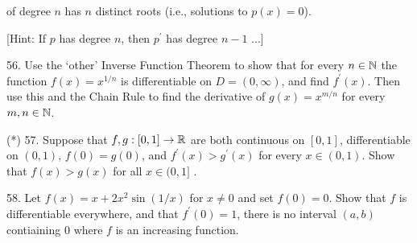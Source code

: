 \documentclass[12pt]{article}
\begin{document}
\begin{description}
\ssk

\item{\spc} of degree $n$ has  
 $n$ distinct roots (i.e., solutions to $p(x)=0$).

\ssk

\item{\spc} [Hint: If $p$ has degree $n$, then $p^\prime$ has degree $n-1$ ...]
 
\msk

\item{56.} Use the `other' Inverse Function Theorem to show that for every $n\in{\mathbb N}$ 
the function $f(x)=x^{1/n}$ is differentiable on $D=(0,\infty)$, and find $f^\prime(x)$.
Then use this and the Chain Rule to find the derivative of $g(x)=x^{m/n}$ for every $m,n\in{\mathbb N}$.

\msk

\item{(*) 57.} Suppose that $f,g:[0,1]\rightarrow{\mathbb R}$ are both continuous on $[0,1]$, differentiable 
on $(0,1)$, $f(0)=g(0)$, and
$f^\prime(x)>g^\prime(x)$ for every $x\in (0,1)$. Show that
$f(x)>g(x)$ for all $x\in (0,1]$ .

\msk

\item{58.} Let $f(x)=x+2x^2\sin(1/x)$ for $x\neq 0$ and set $f(0)=0$. Show that
$f$ is differentiable everywhere, and that $f^\prime(0)=1$,  there is no
interval $(a,b)$ contiaining $0$ where $f$ is an increasing function.

\end{description}
\vfill
\end{document}
